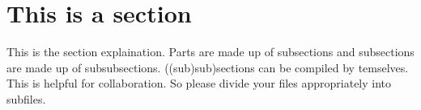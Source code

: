 \documentclass[../../main.tex]{subfiles}
\begin{document}
\section{This is a section}
This is the section explaination. Parts are made up of subsections and subsections are made up of subsubsections.
((sub)sub)sections can be compiled by temselves. This is helpful for collaboration. So please divide your files appropriately into subfiles.




\end{document}
